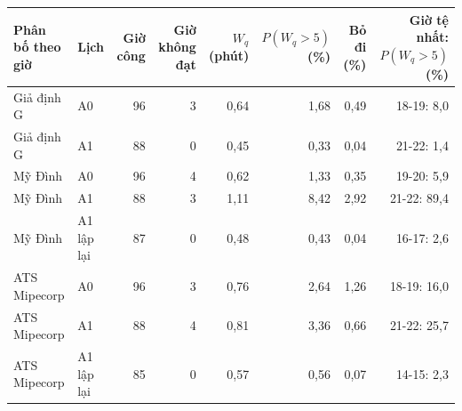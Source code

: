 \begin{tabular}{llrrrrrr}
\toprule
\textbf{Phân bố theo giờ} & \textbf{Lịch} & \textbf{Giờ công} & \textbf{Giờ không đạt} & \textbf{$W_q$ (phút)} & \textbf{$P(W_q{>}5)$ (\%)} & \textbf{Bỏ đi (\%)} & \textbf{Giờ tệ nhất: $P(W_q{>}5)$ (\%)} \\
\midrule
Giả định G & A0 & 96 & 3 & 0{,}64 & 1{,}68 & 0{,}49 & 18-19: 8{,}0 \\
Giả định G & A1 & 88 & 0 & 0{,}45 & 0{,}33 & 0{,}04 & 21-22: 1{,}4 \\
Mỹ Đình & A0 & 96 & 4 & 0{,}62 & 1{,}33 & 0{,}35 & 19-20: 5{,}9 \\
Mỹ Đình & A1 & 88 & 3 & 1{,}11 & 8{,}42 & 2{,}92 & 21-22: 89{,}4 \\
Mỹ Đình & A1 lập lại & 87 & 0 & 0{,}48 & 0{,}43 & 0{,}04 & 16-17: 2{,}6 \\
ATS Mipecorp & A0 & 96 & 3 & 0{,}76 & 2{,}64 & 1{,}26 & 18-19: 16{,}0 \\
ATS Mipecorp & A1 & 88 & 4 & 0{,}81 & 3{,}36 & 0{,}66 & 21-22: 25{,}7 \\
ATS Mipecorp & A1 lập lại & 85 & 0 & 0{,}57 & 0{,}56 & 0{,}07 & 14-15: 2{,}3 \\
\bottomrule
\end{tabular}
